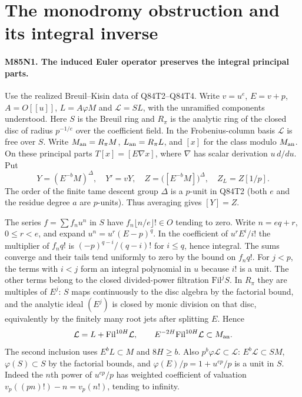 \section{The monodromy obstruction and its integral inverse}

\paragraph{M85N1. The induced Euler operator preserves the integral principal parts.}
Use the realized Breuil--Kisin data of Q84T2--Q84T4. Write
$v=u^e$, $E=v+p$, $A=O[[u]]$, $L=A\varphi M$ and
$\mathcal L=SL$, with the unramified components understood.
Here $S$ is the Breuil ring and $R_\pi$ is the analytic ring
of the closed disc of radius $p^{-1/e}$ over the coefficient field.
In the Frobenius-column basis $\mathcal L$ is free over $S$.
Write $M_{\rm an}=R_\pi M$, $L_{\rm an}=R_\pi L$,
and $[x]$ for the class modulo $M_{\rm an}$.
On these principal parts $T[x]=[E\nabla x]$, where
$\nabla$ has scalar derivation $u\,d/du$.
Put
\[
 Y=(E^{-b}M)^\Delta,\quad Y'=vY,\quad
 Z=\bigl([E^{-b}M]\bigr)^\Delta,\quad Z_L=Z[1/p].
\]
The order of the finite tame descent group $\Delta$ is a $p$-unit
in Q84T2 (both $e$ and the residue degree $a$ are $p$-units).
Thus averaging gives $[Y]=Z$.

The series $f=\sum f_nu^n$ in $S$ have
$f_n\lfloor n/e\rfloor!\in O$ tending to zero.
Write $n=eq+r$, $0\le r<e$, and expand $u^n=u^r(E-p)^q$.
In the coefficient of $u^r E^i/i!$ the multiplier of $f_n q!$
is $(-p)^{q-i}/(q-i)!$ for $i\le q$, hence integral.
The sums converge and their tails tend uniformly to zero by
the bound on $f_nq!$. For $j<p$, the terms with
$i<j$ form an integral polynomial in $u$ because $i!$ is a unit.
The other terms belong to the closed divided-power filtration
$\mathrm{Fil}^jS$. In $R_\pi$ they are multiples of $E^j$:
$S$ maps continuously to the disc algebra by the factorial bound,
and the analytic ideal $(E^j)$ is closed by monic division on
that disc, equivalently by the finitely many root jets after
splitting $E$. Hence
\[
 \mathcal L=L+\mathrm{Fil}^{10H}\mathcal L,\qquad
 E^{-2H}\mathrm{Fil}^{10H}\mathcal L\subset M_{\rm an}.
\]
The second inclusion uses $E^b L\subset M$ and $8H\ge b$.
Also $p^b\varphi\mathcal L\subset\mathcal L$:
$E^b\mathcal L\subset SM$, $\varphi(S)\subset S$ by the factorial
bounds, and $\varphi(E)/p=1+u^{ep}/p$ is a unit in $S$.
Indeed the $n$th power of $u^{ep}/p$ has weighted coefficient
of valuation $v_p((pn)!)-n=v_p(n!)$, tending to infinity.

